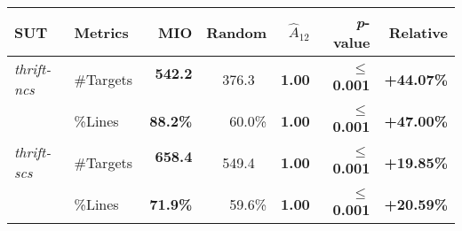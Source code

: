 \begin{tabular}{ l l r r r r r }\\ 
\toprule 
SUT & Metrics & MIO & Random & $\hat{A}_{12}$ & \emph{p}-value  & Relative \\ 
\midrule 
\emph{thrift-ncs}&\#Targets & \textbf{542.2$\phantom{\%}$} & 376.3$\phantom{\%}$ & \textbf{1.00} & \textbf{$\le $0.001} & \textbf{+44.07\%} \\ 
&\%Lines & \textbf{88.2\%} & 60.0\% & \textbf{1.00} & \textbf{$\le $0.001} & \textbf{+47.00\%} \\ 
\emph{thrift-scs}&\#Targets & \textbf{658.4$\phantom{\%}$} & 549.4$\phantom{\%}$ & \textbf{1.00} & \textbf{$\le $0.001} & \textbf{+19.85\%} \\ 
&\%Lines & \textbf{71.9\%} & 59.6\% & \textbf{1.00} & \textbf{$\le $0.001} & \textbf{+20.59\%} \\ 
\bottomrule 
\end{tabular} 
